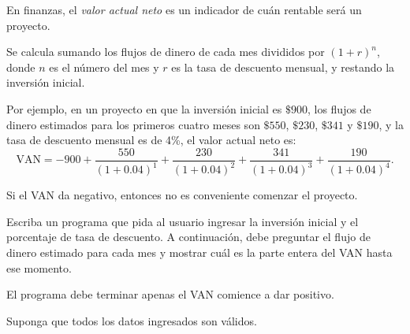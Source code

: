 En finanzas,
el \emph{valor actual neto} es un indicador
de cuán rentable será un proyecto.

Se calcula sumando
los flujos de dinero de cada mes
divididos por \((1 + r)^n\),
donde \(n\) es el número del mes
y \(r\) es la tasa de descuento mensual,
y restando la inversión inicial.

Por ejemplo,
en un proyecto en que la inversión inicial es \(\$900\),
los flujos de dinero estimados para los primeros cuatro meses son
\(\$550\), \(\$230\), \(\$341\) y \(\$190\),
y la tasa de descuento mensual es de 4\%,
el valor actual neto es:
\[
  \text{VAN} = -900 +
               \frac{550}{(1 + 0.04)^1} +
               \frac{230}{(1 + 0.04)^2} +
               \frac{341}{(1 + 0.04)^3} +
               \frac{190}{(1 + 0.04)^4}.
\]

Si el VAN da negativo, entonces no es conveniente comenzar el proyecto.

\begin{minipage}[t]{.43\textwidth}
  Escriba un programa que pida al usuario ingresar la inversión inicial
  y el porcentaje de tasa de descuento.
  A continuación,
  debe preguntar el flujo de dinero estimado para cada mes
  y mostrar cuál es la parte entera del VAN hasta ese momento.

  El programa debe terminar apenas el VAN comience a dar positivo.

  \vspace{1ex}
  Suponga que todos los datos ingresados son válidos.
\end{minipage}
\hfill
\begin{minipage}[t]{.45\textwidth}
  
\end{minipage}

